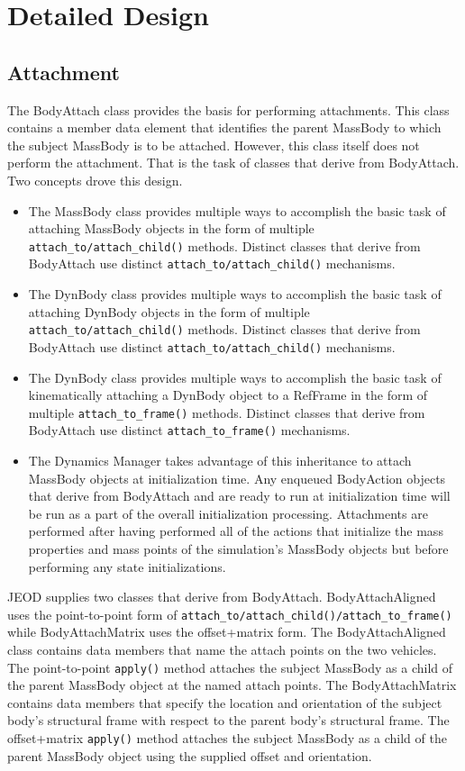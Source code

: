 \section{Detailed Design}

\subsection{Attachment}
The \ModelDesc BodyAttach class provides the basis for performing
attachments. This class contains a member
data element that identifies the parent MassBody to which the subject
MassBody is to be attached.
However, this class itself does not perform the
attachment. That is the task of classes that derive from BodyAttach.
Two concepts drove this design.
\begin{itemize}
\item The MassBody class provides multiple ways to accomplish the basic task of
  attaching MassBody objects in the form of multiple {\tt attach\_to/attach\_child()} methods.
  Distinct classes that derive from BodyAttach use distinct
  {\tt attach\_to/attach\_child()} mechanisms.
\item The DynBody class provides multiple ways to accomplish the basic task of
  attaching DynBody objects in the form of multiple {\tt attach\_to/attach\_child()} methods.
  Distinct classes that derive from BodyAttach use distinct
  {\tt attach\_to/attach\_child()} mechanisms.
\item The DynBody class provides multiple ways to accomplish the basic task of
  kinematically attaching a DynBody object to a RefFrame in the form of multiple {\tt attach\_to\_frame()} methods.
  Distinct classes that derive from BodyAttach use distinct
  {\tt attach\_to\_frame()} mechanisms.
\item The Dynamics Manager takes advantage of this inheritance to attach
  MassBody objects at initialization time. Any enqueued BodyAction objects
  that derive from BodyAttach and are ready to run at initialization
  time will be run as a part of the overall initialization processing.
  Attachments are performed after having performed all of the actions
  that initialize the mass properties and mass points of the simulation's
  MassBody objects but before performing any state initializations.
\end{itemize}

JEOD supplies two classes that derive from BodyAttach.
BodyAttachAligned uses the point-to-point form of {\tt attach\_to/attach\_child()/attach\_to\_frame()}
while BodyAttachMatrix uses the offset+matrix form.
The BodyAttachAligned class contains data members that name the
attach points on the two vehicles.
The point-to-point {\tt apply()} method attaches the
subject MassBody as a child of the parent MassBody object at the named
attach points.
The BodyAttachMatrix contains data members that specify the location
and orientation of the subject body's structural frame with respect to
the parent body's structural frame. The offset+matrix {\tt apply()} method
attaches the subject MassBody as a child of the parent MassBody object
using the supplied offset and orientation.

